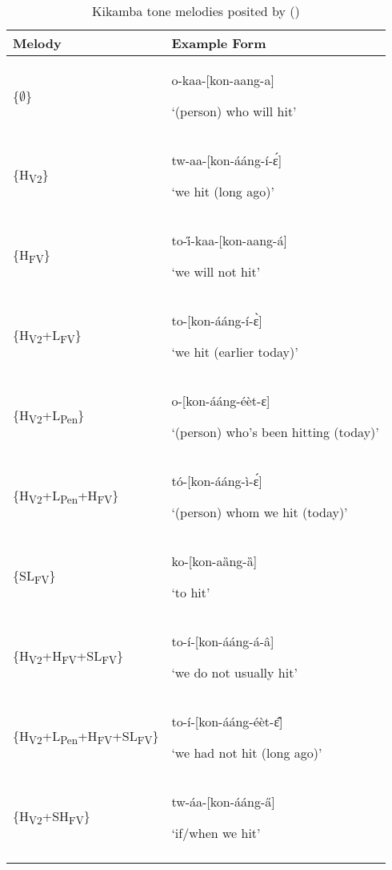 \documentclass[output=paper,newtxmath,modfonts,nonflat,draft]{langsci/langscibook}
\begin{document}
\begin{table}[t]
\begin{tabularx}{\textwidth}{lQ}
\lsptoprule
 Melody &  Example Form\\\midrule
\{${\emptyset}$\} & {o-kaa-[kon-aang-a]}

‘(person) who will hit’\\

\tablevspace
\{H\textsubscript{V2}\} & {tw-aa-[kon-ááng-í-\'ɛ]}

‘we hit (long ago)’\\

\tablevspace
\{H\textsubscript{FV}\} & {to-\H{i}-kaa-[kon-aang-á]}

‘we will not hit’\\

\tablevspace
\{H\textsubscript{V2}+L\textsubscript{FV}\} & {to-[kon-ááng-í-\`ɛ]}

‘we hit (earlier today)’\\

\tablevspace
\{H\textsubscript{V2}+L\textsubscript{Pen}\} & {o-[kon-ááng-éèt-ɛ]}

‘(person) who’s been hitting (today)’\\

\tablevspace
\{H\textsubscript{V2}+L\textsubscript{Pen}+H\textsubscript{FV}\} & {tó-[kon-ááng-ì-\'ɛ]}

‘(person) whom we hit (today)’\\

\tablevspace
\{SL\textsubscript{FV}\} & {ko-[kon-aȁng-ȁ]}

‘to hit’\\

\tablevspace
\{H\textsubscript{V2}+H\textsubscript{FV}+SL\textsubscript{FV}\} & {to-í-[kon-ááng-á-â]}

‘we do not usually hit’\\

\tablevspace
\{H\textsubscript{V2}+L\textsubscript{Pen}+H\textsubscript{FV}+SL\textsubscript{FV}\} & {to-í-[kon-ááng-éèt-\^ɛ]}

‘we had not hit (long ago)’\\

\tablevspace
\{H\textsubscript{V2}+SH\textsubscript{FV}\} & {tw-áa-[kon-ááng-\H{a}]}

‘if/when we hit’\\
\lspbottomrule 
\end{tabularx}
\caption{Kikamba tone melodies posited by \citeauthor{Roberts-Kohno2000} (\citeyear{Roberts-Kohno2000,Roberts-Kohno2014})}
\label{tab:jones:2}
\end{table}
\end{document}
